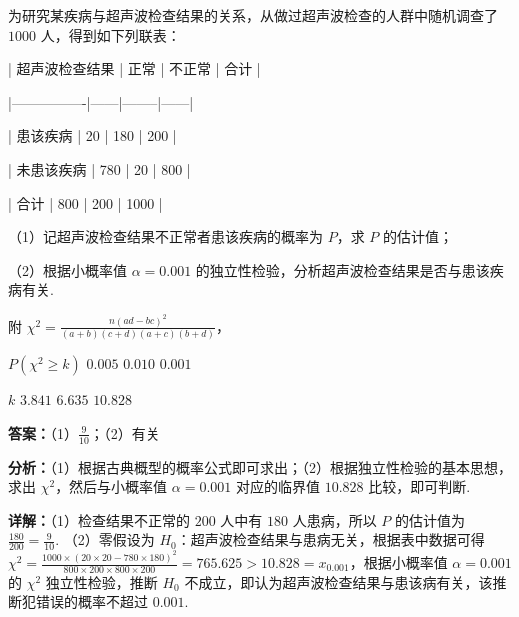 \begin{question}[points=15]
为研究某疾病与超声波检查结果的关系，从做过超声波检查的人群中随机调查了 $1000$ 人，得到如下列联表：



| 超声波检查结果 | 正常 | 不正常 | 合计 |

|----------------|------|--------|------|

| 患该疾病 | 20 | 180 | 200 |

| 未患该疾病 | 780 | 20 | 800 |

| 合计 | 800 | 200 | 1000 |



（1）记超声波检查结果不正常者患该疾病的概率为 $P$，求 $P$ 的估计值；



（2）根据小概率值 $\alpha = 0.001$ 的独立性检验，分析超声波检查结果是否与患该疾病有关.



附 $\chi^2 = \frac{n(ad-bc)^2}{(a+b)(c+d)(a+c)(b+d)}$，



$P(\chi^2 \ge k)$ $0.005$ $0.010$ $0.001$



$k$ $3.841$ $6.635$ $10.828$
\begin{solution}
\textbf{答案：}（1）$\frac{9}{10}$；（2）有关

\textbf{分析：}（1）根据古典概型的概率公式即可求出；（2）根据独立性检验的基本思想，求出 $\chi^2$，然后与小概率值 $\alpha=0.001$ 对应的临界值 $10.828$ 比较，即可判断.

\textbf{详解：}（1）检查结果不正常的 $200$ 人中有 $180$ 人患病，所以 $P$ 的估计值为 $\frac{180}{200} = \frac{9}{10}$.
（2）零假设为 $H_0$：超声波检查结果与患病无关，根据表中数据可得 $\chi^2 = \frac{1000 \times (20\times20 - 780\times180)^2}{800\times200\times800\times200} = 765.625 > 10.828 = x_{0.001}$，根据小概率值 $\alpha=0.001$ 的 $\chi^2$ 独立性检验，推断 $H_0$ 不成立，即认为超声波检查结果与患该病有关，该推断犯错误的概率不超过 $0.001$.
\end{solution}
\end{question}

